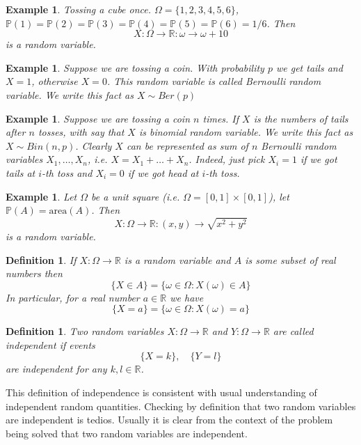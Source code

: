 \documentclass[12pt]{article}
\newtheorem{definition}[theorem]{Definition}
\newtheorem{example}[theorem]{Example}
\begin{document}
\begin{example} Tossing a cube once. $\Omega=\{1,2,3,4,5,6\}$, $\mathbb{P}(1)=\mathbb{P}(2)=\mathbb{P}(3)=\mathbb{P}(4)=\mathbb{P}(5)=\mathbb{P}(6)=1/6$. Then 
$$
X:\Omega\to\mathbb{R}:\omega\to \omega+10
$$
is a random variable.
\end{example}

\begin{example} Suppose we are tossing a coin. With probability $p$ we get tails and $X=1$, otherwise $X=0$. This random variable is called Bernoulli random variable. We write this fact as $X\sim Ber(p)$
\end{example}

\begin{example} Suppose we are tossing a coin $n$ times. If $X$ is the numbers of tails after $n$ tosses, with say that $X$ is binomial random variable. We write this fact as $X\sim Bin(n,p)$. Clearly $X$ can be represented as sum of $n$ Bernoulli random variables $X_1,\ldots,X_n$, i.e. $X=X_1+\ldots+X_n$. Indeed, just pick $X_i=1$ if we got tails at $i$-th toss and $X_i=0$ if we got head at $i$-th toss. 
\end{example}

\begin{example} Let $\Omega$ be a unit square (i.e. $\Omega=[0,1]\times[0,1]$), let $\mathbb{P}(A)=\mbox{area}(A)$. Then
$$
X:\Omega\to\mathbb{R}:(x,y)\to\sqrt{x^2+y^2}
$$
is a random variable.
\end{example}

\begin{definition} If $X:\Omega\to\mathbb{R}$ is a random variable and $A$ is some subset of real numbers then 
$$
\{X\in A\}=\{\omega\in\Omega:X(\omega)\in A\}
$$
In particular, for a real number $a\in\mathbb{R}$ we have
$$
\{X=a\}=\{\omega\in\Omega:X(\omega)=a\}
$$
\end{definition}

\begin{definition} Two random variables $X:\Omega\to\mathbb{R}$ and $Y:\Omega\to\mathbb{R}$ are called independent if
events 
$$
\{X=k\},\quad \{Y=l\}
$$
are independent for any $k,l\in\mathbb{R}$.
\end{definition}

This definition of independence is consistent with usual understanding of independent random quantities. Checking by definition that two random variables are independent is tedios. Usually it is clear from the context of the problem being solved that two random variables are independent.
\end{document}
